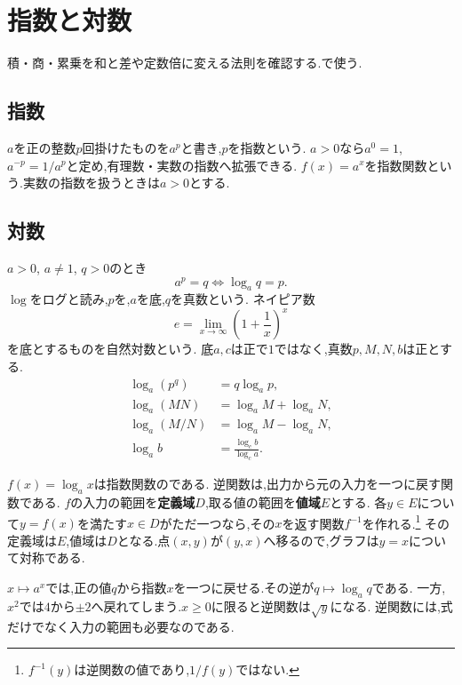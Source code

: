 
\section{指数と対数}\label{節：指数対数}
  積・商・累乗を和と差や定数倍に変える法則を確認する.で使う.

  \subsection{指数}\label{節：指数}
    $a$を正の整数$p$回掛けたものを$a^p$と書き,$p$を指数という.
    $a>0$なら$a^0=1$, $a^{-p}=1/a^p$と定め,有理数・実数の指数へ拡張できる.
    $f(x)=a^x$を指数関数という.実数の指数を扱うときは$a>0$とする.

  \subsection{対数}\label{節：対数}
    $a>0$, $a\ne1$, $q>0$のとき
    \[
      a^p=q\iff\log_a q=p.
    \]
    $\log$をログと読み,$p$を,$a$を底,$q$を真数という.
    ネイピア数
    \[
      e=\lim_{x\to\infty}\left(1+\frac1x\right)^x
    \]
    を底とするものを自然対数という.
    底$a,c$は正で$1$ではなく,真数$p,M,N,b$は正とする.
    \begin{align*}
      \log_a(p^q)&=q\log_a p,\\
      \log_a(MN)&=\log_a M+\log_a N,\\
      \log_a(M/N)&=\log_a M-\log_a N,\\
      \log_a b&=\frac{\log_c b}{\log_c a}.
    \end{align*}

    $f(x)=\log_a x$は指数関数のである.
    逆関数は,出力から元の入力を一つに戻す関数である.
    $f$の入力の範囲を\textbf{定義域}$D$,取る値の範囲を\textbf{値域}$E$とする.
    各$y\in E$について$y=f(x)$を満たす$x\in D$がただ一つなら,その$x$を返す関数$f^{-1}$を作れる.\footnote{$f^{-1}(y)$は逆関数の値であり,$1/f(y)$ではない.}
    その定義域は$E$,値域は$D$となる.点$(x,y)$が$(y,x)$へ移るので,グラフは$y=x$について対称である.

    $x\mapsto a^x$では,正の値$q$から指数$x$を一つに戻せる.その逆が$q\mapsto\log_a q$である.
    一方,$x^2$では$4$から$\pm2$へ戻れてしまう.$x\ge0$に限ると逆関数は$\sqrt y$になる.
    逆関数には,式だけでなく入力の範囲も必要なのである.
